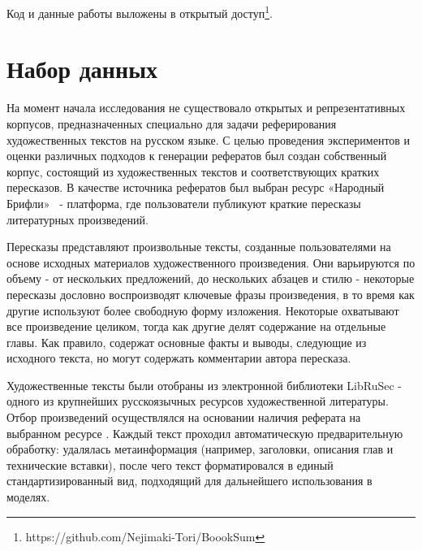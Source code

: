 \documentclass{superfri}
\begin{document}
Код и данные работы выложены в открытый доступ\footnote{https://github.com/Nejimaki-Tori/BoookSum}.


\section{Набор данных}
На момент начала исследования не существовало открытых и репрезентативных корпусов, предназначенных специально для задачи реферирования художественных текстов на русском языке. 
С целью проведения экспериментов и оценки различных подходов к генерации рефератов был создан собственный корпус, состоящий из художественных текстов и соответствующих кратких пересказов. 
В качестве источника рефератов был выбран ресурс «Народный Брифли»~\cite{Briefly} - платформа, где пользователи публикуют краткие пересказы литературных произведений. 

Пересказы представляют произвольные тексты, созданные пользователями на основе исходных материалов художественного произведения. Они варьируются по объему - от нескольких предложений,
до нескольких абзацев и стилю - некоторые пересказы дословно воспроизводят ключевые фразы произведения, в то время как другие используют более свободную форму изложения. Некоторые
охватывают все произведение целиком, тогда как другие делят содержание на отдельные главы. 
Как правило, содержат основные факты и выводы, следующие из исходного текста, но могут содержать комментарии автора пересказа.

Художественные тексты были отобраны из электронной библиотеки LibRuSec \cite{librusec} - одного из крупнейших русскоязычных ресурсов художественной литературы. 
Отбор произведений осуществлялся на основании наличия реферата на выбранном ресурсе \cite{Briefly}. Каждый текст проходил автоматическую предварительную обработку: удалялась метаинформация (например, заголовки, описания глав и технические вставки), 
после чего текст форматировался в единый стандартизированный вид, подходящий для дальнейшего использования в моделях. 
\end{document}
